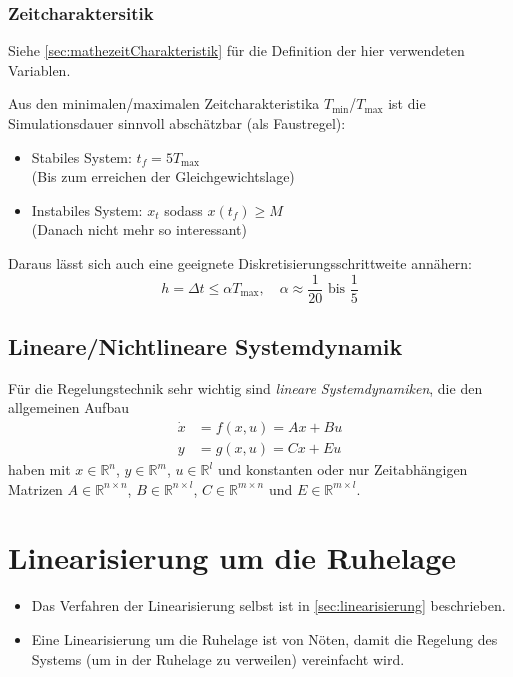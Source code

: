             \subsubsection{Zeitcharaktersitik} %
                Siehe \ref{sec:mathezeitCharakteristik} für die Definition der hier verwendeten Variablen.
            
                Aus den minimalen/maximalen Zeitcharakteristika \( T _ {\min} \)/\( T _ {\max} \) ist die Simulationsdauer sinnvoll abschätzbar (als Faustregel):
                \begin{itemize}
                	\item Stabiles System: \( t _ f = 5 T _ {\max} \) \\ (Bis zum erreichen der Gleichgewichtslage)
                	\item Instabiles System: \(x_t\) sodass \( x(t _ f) \geq M \) \\ (Danach nicht mehr so interessant)
                \end{itemize}
                Daraus lässt sich auch eine geeignete Diskretisierungsschrittweite annähern:
                \begin{equation*}
	                h = \Delta t \leq \alpha T _ {\max}, \quad \alpha \approx \frac{1}{20} \text{ bis } \frac{1}{5}
                \end{equation*}

        \subsection{Lineare/Nichtlineare Systemdynamik} %
            Für die Regelungstechnik sehr wichtig sind \textit{lineare Systemdynamiken}, die den allgemeinen Aufbau
            \begin{align*}
                \dot{x} &= f(x, u) = Ax + Bu \\
                y       &= g(x, u) = Cx + Eu
            \end{align*}
            haben mit \( x \in \mathbb{R} ^ n \), \( y \in \mathbb{R} ^ m \), \( u \in \mathbb{R} ^ l \) und konstanten oder nur Zeitabhängigen Matrizen \( A \in \mathbb{R} ^ { n \times n } \), \( B \in \mathbb{R} ^ { n \times l } \), \( C \in \mathbb{R} ^ { m \times n } \) und \( E \in \mathbb{R} ^ { m \times l } \).

    \section{Linearisierung um die Ruhelage} %
        \begin{itemize}
        	\item Das Verfahren der Linearisierung selbst ist in \ref{sec:linearisierung} beschrieben.
        	\item Eine Linearisierung um die Ruhelage ist von Nöten, damit die Regelung des Systems (um in der Ruhelage zu verweilen) vereinfacht wird.
        \end{itemize}

